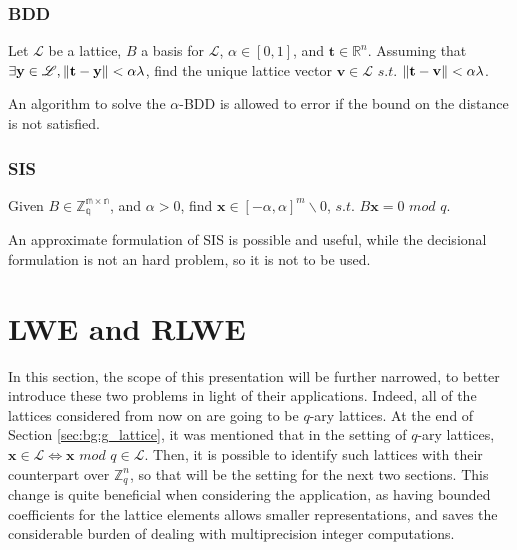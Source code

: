 \subsubsection{BDD}

\begin{definition}
Let $\mathscr{L}$ be a lattice, $B$ a basis for $\mathscr{L}$, $\alpha\in[0,1]$, and $\mathbf{t}\in\mathbb{R}^n$. Assuming that $\exists \mathbf{y}\in\mathscr{L},\left\lVert \mathbf{t}-\mathbf{y} \right\rVert < \alpha\lambda$, find the unique lattice vector $\mathbf{v}\in\mathscr{L}$ $s.t.$ $\left\lVert \mathbf{t}-\mathbf{v} \right\rVert<\alpha\lambda$.
\end{definition}

\begin{remark}
An algorithm to solve the $\alpha$-BDD is allowed to error if the bound on the distance is not satisfied.
\end{remark}

\subsubsection{SIS}

\begin{definition}
Given $B\in\mathbb{Z_q^{m\times n}}$, and $\alpha > 0$, find $\mathbf{x}\in[-\alpha,\alpha]^m\backslash{0}$, $s.t.$ $B\mathbf{x}=0$ $mod$ $q$.
\end{definition}

\begin{remark}
An approximate formulation of SIS is possible and useful, while the decisional formulation is not an hard problem, so it is not to be used.
\end{remark}

\section{LWE and RLWE}
In this section, the scope of this presentation will be further narrowed, to better introduce these two problems in light of their applications. Indeed, all of the lattices considered from now on are going to be $q$-ary lattices. At the end of Section \ref{sec:bg:g_lattice}, it was mentioned that in the setting of $q$-ary lattices, $\mathbf{x}\in\mathscr{L}\Leftrightarrow\mathbf{x}$ $mod$ $q\in\mathscr{L}$. Then, it is possible to identify such lattices with their counterpart over $\mathbb{Z}_q^n$, so that will be the setting for the next two sections. This change is quite beneficial when considering the application, as having bounded coefficients for the lattice elements allows smaller representations, and saves the considerable burden of dealing with  multiprecision integer computations. \\

